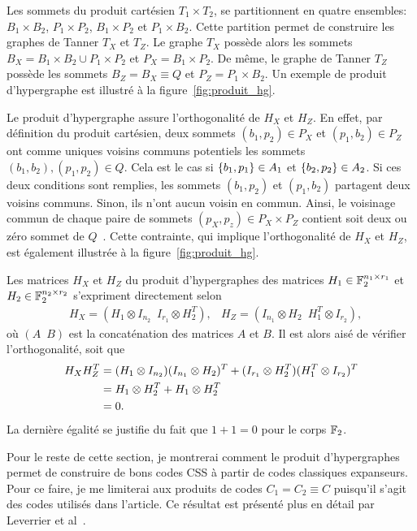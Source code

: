 Les sommets du produit cartésien $T_1 \times T_2$, 
se partitionnent en quatre ensembles:
$B_1 \times B_2$, $P_1 \times P_2$, $B_1 \times P_2$ et $P_1 \times B_2$.
Cette partition permet de construire les graphes de Tanner $T_X$ et $T_Z$.
Le graphe $T_X$ possède alors les sommets $B_X = B_1 \times B_2 \cup P_1 \times P_2$
et $P_X = B_1 \times P_2$.
De même,
le graphe de Tanner $T_Z$ possède les sommets $B_Z = B_X \equiv Q$
et $P_Z = P_1 \times B_2$.
Un exemple de produit d'hypergraphe est illustré à la figure~\ref{fig:produit_hg}.

Le produit d'hypergraphe assure l'orthogonalité de $H_X$ et $H_Z$.
En effet,
par définition du produit cartésien,
deux sommets $(b_1, p_2) \in P_X$ et $(p_1, b_2) \in P_Z$ 
ont comme uniques voisins communs potentiels les sommets $(b_1, b_2), (p_1, p_2) \in Q$.
Cela est le cas si $\qty{b_1, p_1} \in A_1$ et $\qty{b_2, p_2} \in A_2$.
Si ces deux conditions sont remplies,
les sommets $(b_1, p_2)$ et $(p_1, b_2)$ partagent deux voisins communs.
Sinon,
ils n'ont aucun voisin en commun.
Ainsi, le voisinage commun de chaque paire de sommets $(p_X, p_z) \in P_X \times P_Z$
contient soit deux ou zéro sommet de $Q$~\cite{tillich_quantum_2014}.
Cette contrainte,
qui implique l'orthogonalité de $H_X$ et $H_Z$,
est également illustrée à la figure~\ref{fig:produit_hg}.

Les matrices $H_X$ et $H_Z$ du produit d'hypergraphes des matrices
$H_1 \in \mathbb{F}_{2}^{n_1 \times r_1}$
et
$H_2 \in \mathbb{F}_{2}^{n_2 \times r_2}$
s'expriment directement selon~\cite{tillich_quantum_2014}
\begin{align}
	&H_X = (H_1 \otimes I_{n_2}\, \, \, I_{r_1} \otimes H_2^T),
	&H_Z = (I_{n_1} \otimes H_2 \, \, \, H_1^T \otimes I_{r_2}),
	\label{eq:prod_hg_mat}
\end{align}
où $(A \, \, \, B)$ est la concaténation des matrices $A$ et $B$.
Il est alors aisé de vérifier l'orthogonalité,
soit que
\begin{align}
	H_X H_Z^T 
	&=
	(H_1 \otimes I_{n_2})(I_{n_1} \otimes H_2)^T 
	+ (I_{r_1} \otimes H_2^T)(H_1^T \otimes I_{r_2})^T
	\notag \\
	&= 
	H_1 \otimes H_2^T + H_1 \otimes H_2^T
	\notag \\
	&= 0.
\end{align}
La dernière égalité se justifie du fait que $1 + 1 = 0$ pour le corps $\mathbb{F}_{2}$.

Pour le reste de cette section,
je montrerai comment le produit d'hypergraphes permet de construire de bons codes CSS
à partir de codes classiques expanseurs.
Pour ce faire,
je me limiterai aux produits de codes $C_1 = C_2 \equiv C$ 
puisqu'il s'agit des codes utilisés dans l'article.
Ce résultat est présenté plus en détail par Leverrier et al~\cite{leverrier_quantum_2015}.

